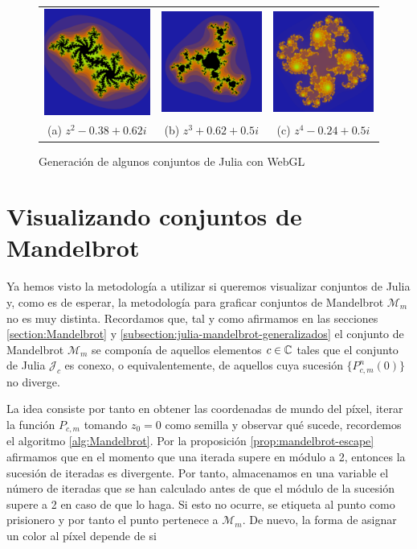 \begin{figure}[ht]
    \centering
    \begin{tabular}{ccc}
      \includegraphics[scale=0.2]{img/C6/julia-1.png} &   \includegraphics[scale=0.2]{img/C6/julia-2.png} &   \includegraphics[scale=0.2]{img/C6/julia-3.png} \\
    (a) $z^2-0.38+0.62i$ & (b) $z^3+0.62+0.5i$ & (c) $z^4-0.24+0.5i$ \\[6pt]
    \end{tabular}
    \caption{Generación de algunos conjuntos de Julia con WebGL}
    \label{fig:julia-webgl}
\end{figure}

\section{Visualizando conjuntos de Mandelbrot}

Ya hemos visto la metodología a utilizar si queremos visualizar conjuntos de Julia y, como es de esperar, la metodología para graficar conjuntos de Mandelbrot $\mathcal{M}_m$ no es muy distinta. Recordamos que, tal y como afirmamos en las secciones \ref{section:Mandelbrot} y \ref{subsection:julia-mandelbrot-generalizados} el conjunto de Mandelbrot $\mathcal{M}_m$ se componía de aquellos elementos $c\in\mathbb{C}$ tales que el conjunto de Julia $\mathcal{J}_c$ es conexo, o equivalentemente, de aquellos cuya sucesión $\{P_{c,m}^n(0)\}$ no diverge.

La idea consiste por tanto en obtener las coordenadas de mundo del píxel, iterar la función $P_{c,m}$ tomando $z_0=0$ como semilla y observar qué sucede, recordemos el algoritmo \ref{alg:Mandelbrot}. Por la proposición \ref{prop:mandelbrot-escape} afirmamos que en el momento que una iterada supere en módulo a 2, entonces la sucesión de iteradas es divergente. Por tanto, almacenamos en una variable el número de iteradas que se han calculado antes de que el módulo de la sucesión supere a 2 en caso de que lo haga. Si esto no ocurre, se etiqueta al punto como prisionero y por tanto el punto pertenece a $\mathcal{M}_m$. De nuevo, la forma de asignar un color al píxel depende de si 